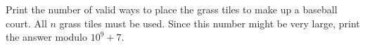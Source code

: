 

Print the number of valid ways to place the grass tiles
to make up a baseball court. All $n$ grass tiles must be used.
Since this number might be very large, print the answer
modulo $10^9 + 7$.
